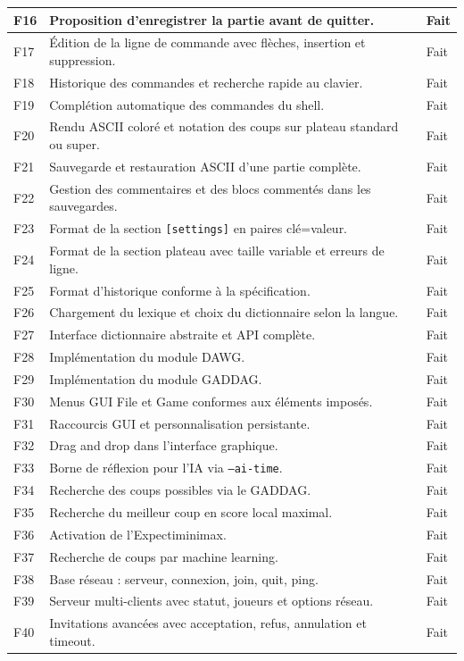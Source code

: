 \documentclass[a4paper]{article}
\begin{document}
\begin{longtable}{|p{1.3cm}|p{11.4cm}|p{1.8cm}|}
    \hline
    F16 & Proposition d'enregistrer la partie avant de quitter. & Fait \\
    \hline
    F17 & Édition de la ligne de commande avec flèches, insertion et suppression. & Fait \\
    \hline
    F18 & Historique des commandes et recherche rapide au clavier. & Fait \\
    \hline
    F19 & Complétion automatique des commandes du shell. & Fait \\
    \hline
    F20 & Rendu ASCII coloré et notation des coups sur plateau standard ou super. & Fait \\
    \hline
    F21 & Sauvegarde et restauration ASCII d'une partie complète. & Fait \\
    \hline
    F22 & Gestion des commentaires et des blocs commentés dans les sauvegardes. & Fait \\
    \hline
    F23 & Format de la section \texttt{[settings]} en paires clé=valeur. & Fait \\
    \hline
    F24 & Format de la section plateau avec taille variable et erreurs de ligne. & Fait \\
    \hline
    F25 & Format d'historique conforme à la spécification. & Fait \\
    \hline
    F26 & Chargement du lexique et choix du dictionnaire selon la langue. & Fait \\
    \hline
    F27 & Interface dictionnaire abstraite et API complète. & Fait \\
    \hline
    F28 & Implémentation du module DAWG. & Fait \\
    \hline
    F29 & Implémentation du module GADDAG. & Fait \\
    \hline
    F30 & Menus GUI File et Game conformes aux éléments imposés. & Fait \\
    \hline
    F31 & Raccourcis GUI et personnalisation persistante. & Fait \\
    \hline
    F32 & Drag and drop dans l'interface graphique. & Fait \\
    \hline
    F33 & Borne de réflexion pour l'IA via \texttt{--ai-time}. & Fait \\
    \hline
    F34 & Recherche des coups possibles via le GADDAG. & Fait \\
    \hline
    F35 & Recherche du meilleur coup en score local maximal. & Fait \\
    \hline
    F36 & Activation de l'Expectiminimax. & Fait \\
    \hline
    F37 & Recherche de coups par machine learning. & Fait \\
    \hline
    F38 & Base réseau : serveur, connexion, join, quit, ping. & Fait \\
    \hline
    F39 & Serveur multi-clients avec statut, joueurs et options réseau. & Fait \\
    \hline
    F40 & Invitations avancées avec acceptation, refus, annulation et timeout. & Fait \\
    \hline
\end{longtable}
\end{document}
